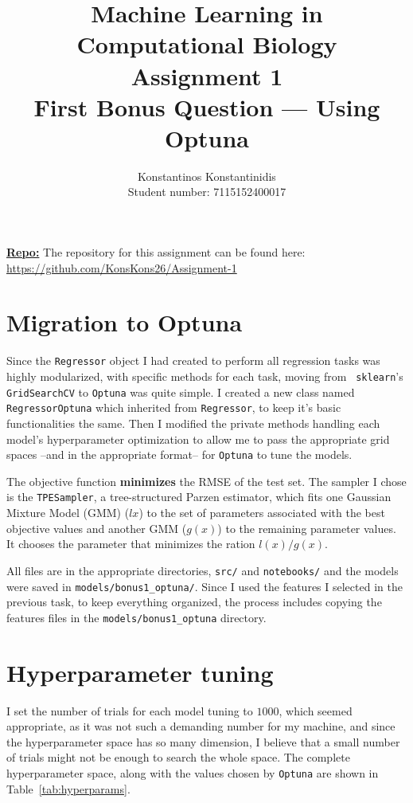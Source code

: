 \documentclass[12pt]{article}
\title{%
    Machine Learning in Computational Biology \\
    \Large Assignment 1 \\
    First Bonus Question --- Using Optuna
    }
\author{%
    Konstantinos Konstantinidis \\
    Student number: 7115152400017
    }
\begin{document}
\maketitle

\vspace{0.5in}

\textbf{\underline{Repo:}} The repository for this assignment can be found here: \\
\url{https://github.com/KonsKons26/Assignment-1}

\vspace{0.5in}

\tableofcontents
\clearpage


\section{Migration to Optuna}
Since the \texttt{Regressor} object I had created to perform all regression tasks
was highly modularized, with specific methods for each task, moving from \texttt{%
sklearn}'s \texttt{GridSearchCV} to \texttt{Optuna} was quite simple. I created
a new class named \texttt{RegressorOptuna} which inherited from \texttt{Regressor},
to keep it's basic functionalities the same. Then I modified the private methods
handling each model's hyperparameter optimization to allow me to pass the appropriate
grid spaces --and in the appropriate format-- for \texttt{Optuna} to tune the models.

The objective function \textbf{minimizes} the RMSE of the test set. The sampler
I chose is the \texttt{TPESampler}, a tree-structured Parzen estimator, which fits
one Gaussian Mixture Model (GMM) ($l{x}$) to the set of parameters associated with
the best objective values and another GMM ($g(x)$) to the remaining parameter values.
It chooses the parameter that minimizes the ration $l(x)/g(x)$.

All files are in the appropriate directories, \texttt{src/} and \texttt{notebooks/}
and the models were saved in \texttt{models/bonus1\_optuna/}. Since I used the
features I selected in the previous task, to keep everything organized, the process
includes copying the features files in the \texttt{models/bonus1\_optuna}
directory.

\section{Hyperparameter tuning}
I set the number of trials for each model tuning to $1000$, which seemed appropriate,
as it was not such a demanding number for my machine, and since the hyperparameter
space has so many dimension, I believe that a small number of trials might not be
enough to search the whole space. The complete hyperparameter space, along with the
values chosen by \texttt{Optuna} are shown in Table~\ref{tab:hyperparams}.
\end{document}
